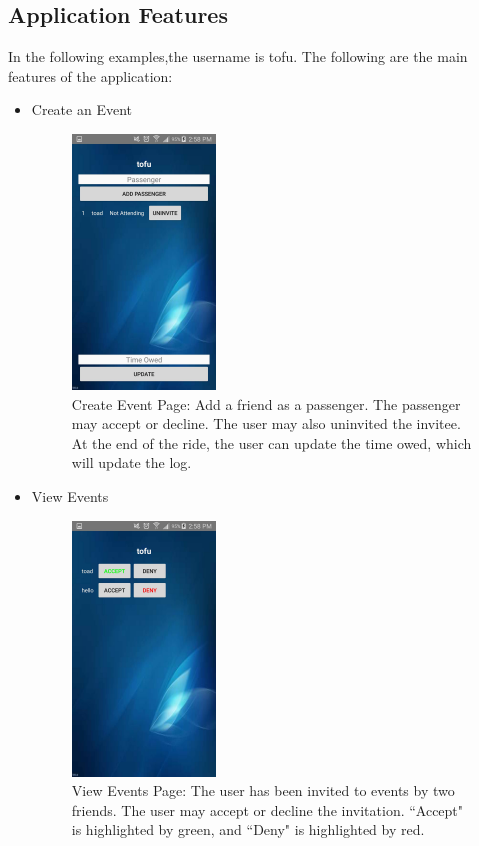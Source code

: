 \documentclass[12pt]{article}
\begin{document}
\subsection{Application Features}
In the following examples,the username is tofu.
The following are the main features of the application:
\begin{itemize}
\newpage
\item Create an Event
    \begin{figure}[H]
        \centering
        \includegraphics[width=1.5in]{create_event.jpg}
        \caption{Create Event Page: Add a friend as a passenger. The passenger may accept or decline.
        The user may also uninvited the invitee. At the end of the ride, the user can update the time owed, 
        which will update the log.}
        \label{create_event}
    \end{figure} 
\item View Events
    \begin{figure}[H]
        \centering
        \includegraphics[width=1.5in]{view_events.jpg}
        \caption{View Events Page: The user has been invited to events by two friends. The user may accept 
        or decline the invitation. ``Accept" is highlighted by green, and ``Deny" is highlighted by red.}

\end{figure}
\end{itemize}
\end{document}
